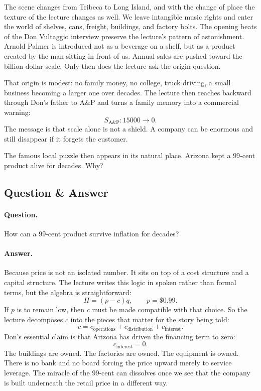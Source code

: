 The scene changes from Tribeca to Long Island, and with the change of place the texture of the lecture changes as well. We leave intangible music rights and enter the world of shelves, cans, freight, buildings, and factory bolts. The opening beats of the Don Vultaggio interview preserve the lecture's pattern of astonishment. Arnold Palmer is introduced not as a beverage on a shelf, but as a product created by the man sitting in front of us. Annual sales are pushed toward the billion-dollar scale. Only then does the lecture ask the origin question.

That origin is modest: no family money, no college, truck driving, a small business becoming a larger one over decades. The lecture then reaches backward through Don's father to A\&P and turns a family memory into a commercial warning:
\begin{equation}
S_{\mathrm{A\&P}}:15000\to 0.
\end{equation}
The message is that scale alone is not a shield. A company can be enormous and still disappear if it forgets the customer.

The famous local puzzle then appears in its natural place. Arizona kept a \(99\)-cent product alive for decades. Why?

\subsection{Question \& Answer}

\paragraph{Question.} How can a \(99\)-cent product survive inflation for decades?

\paragraph{Answer.} Because price is not an isolated number. It sits on top of a cost structure and a capital structure. The lecture writes this logic in spoken rather than formal terms, but the algebra is straightforward:
\begin{equation}
\Pi=(p-c)q,\qquad p=\$0.99.
\end{equation}
If \(p\) is to remain low, then \(c\) must be made compatible with that choice. So the lecture decomposes \(c\) into the pieces that matter for the story being told:
\begin{equation}
c=c_{\mathrm{operations}}+c_{\mathrm{distribution}}+c_{\mathrm{interest}}.
\end{equation}
Don's essential claim is that Arizona has driven the financing term to zero:
\begin{equation}
c_{\mathrm{interest}}=0.
\end{equation}
The buildings are owned. The factories are owned. The equipment is owned. There is no bank and no board forcing the price upward merely to service leverage. The miracle of the \(99\)-cent can dissolves once we see that the company is built underneath the retail price in a different way.


